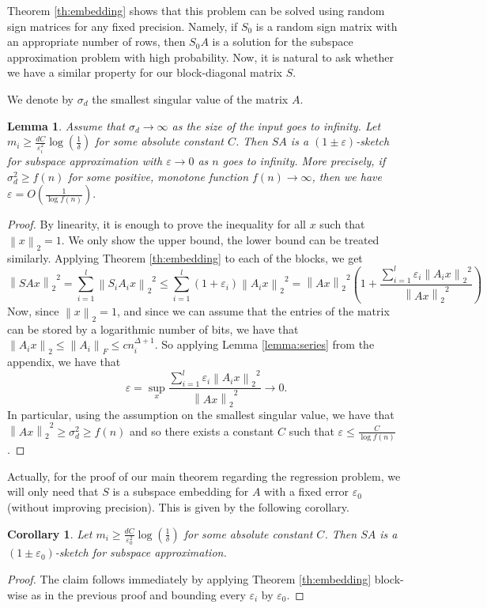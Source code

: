 \documentclass[a4paper,11pt,oneside,english,onecolumn]{article}
\newtheorem{lemma}[theorem]{Lemma}
\newtheorem{corollary}[theorem]{Corollary}
\theoremstyle{definition}
\newcommand{\bigO}[1]{\ensuremath{O\left( #1 \right)}}
\newcommand{\norm}[1]{\ensuremath{\left\| #1\right\|_2}}
\newcommand{\normF}[1]{\ensuremath{\left\| #1\right\|_F}}
\newcommand{\eps}{\ensuremath{\varepsilon}}
\begin{document}
Theorem \ref{th:embedding} shows that this problem can be solved using random sign matrices for any fixed precision. Namely, if $S_0$ is a random sign matrix with an appropriate number of rows, then $S_0A$ is a solution for the subspace approximation problem with high probability. Now, it is natural to ask whether we have a  similar property for our block-diagonal matrix $S$.

We denote by $\sigma_d$ the smallest singular value of the matrix $A$.
\begin{lemma}
\label{lemma:improvedSubspaceEmbedding}
Assume that $\sigma_d \rightarrow \infty$ as the size of the input goes to infinity. Let $m_i \geq \frac{d C}{\eps_i^2} \log(\frac{1}{\delta})$ for some absolute constant $C$. Then $SA$ is a $(1 \pm \eps)$-sketch for subspace approximation with $\eps \rightarrow 0$ as $n$ goes to infinity. More precisely, if $\sigma_d^2 \geq f(n)$ for some positive, monotone function $f(n) \rightarrow \infty$, then we have $\eps = \bigO{\frac{1}{\log f(n)}}.$
\end{lemma}
\begin{proof}
By linearity, it is enough to prove the inequality for all $x$ such that $\norm x = 1$. We only show the upper bound, the lower bound can be treated similarly. Applying Theorem \ref{th:embedding} to each of the blocks, we get
$$\norm{SAx}^2 = \sum_{i=1}^l \norm{S_iA_ix}^2 \leq \sum_{i = 1}^l (1 + \eps_i) \norm{A_ix}^2  = \norm{Ax}^2\left( 1 + \frac{\sum_{i=1}^l \eps_i\norm{A_ix}^2}{\norm{Ax}^2}\right)$$
Now, since $\norm x = 1$, and since we can assume that the entries of the matrix can be stored by a logarithmic number of bits, we have that $\norm{A_ix} \leq \normF{A_i} \leq c n_i^{\Delta+1} $. So applying Lemma \ref{lemma:series} from the appendix, we have that
$$\eps = \sup_{x} \frac{\sum_{i=1}^l \eps_i\norm{A_ix}^2}{\norm{Ax}^2} \rightarrow 0.$$
In particular, using the assumption on the smallest singular value, we have that $\norm{Ax}^2 \geq \sigma_d^2 \geq f(n)$ and so there exists a constant $C$ such that
$\eps \leq \frac{C}{\log f(n)}$.
\end{proof}

 Actually, for the proof of our main theorem regarding the regression problem, we will only need that $S$ is a subspace embedding for $A$ with a fixed error $\eps_0$ (without improving precision). This is given by the following corollary. 
\begin{corollary}
\label{corollary:simpleSubspaceEmbedding}
Let $m_i \geq \frac{d C}{\eps_0^2} \log(\frac{1}{\delta})$ for some absolute constant $C$. Then $SA$ is a $(1 \pm \eps_0)$-sketch for subspace approximation.
\end{corollary}
\begin{proof}
The claim follows immediately by applying Theorem \ref{th:embedding} block-wise as in the previous proof and bounding every $\eps_i$ by $\eps_0$.
\end{proof}
\end{document}
